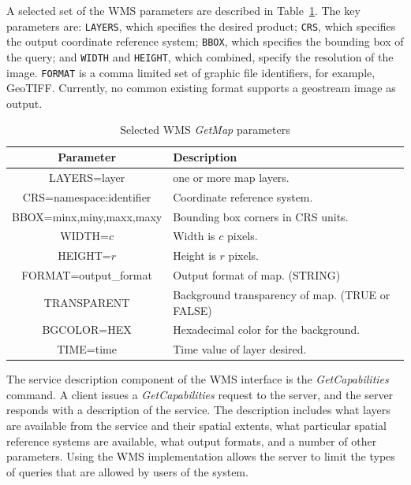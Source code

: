 \documentclass{ucdthesis}       %
\begin{document}
A selected set of the \ac{WMS} parameters are described in
Table~\ref{tab:wms-getmap-parameters}.  The key parameters are:
\texttt{LAYERS}, which specifies the desired product; \texttt{CRS},
which specifies the output coordinate reference system; \texttt{BBOX},
which specifies the bounding box of the query; and \texttt{WIDTH} and
\texttt{HEIGHT}, which combined, specify the resolution of the image.
\texttt{FORMAT} is a comma limited set of graphic file identifiers,
for example, GeoTIFF.  Currently, no common existing format supports a
geostream image as output.
%
\begin{table}[htb]
  \centering
  \caption{Selected \ac{WMS} \emph{GetMap} parameters}
  \begin{tabular}{c|l}
    Parameter & Description \\
    \hline \hline
    LAYERS=layer & one or more map layers.\\
    CRS=namespace:identifier & Coordinate reference system. \\
    BBOX=minx,miny,maxx,maxy & Bounding box corners in CRS units.\\
    WIDTH=$c$ & Width is $c$ pixels.\\
    HEIGHT=$r$ & Height is $r$ pixels.\\
    FORMAT=output\_format & Output format of map. (STRING)\\
    TRANSPARENT & Background transparency of map. (TRUE or FALSE) \\
    BGCOLOR=HEX & Hexadecimal color for the background. \\
    TIME=time & Time value of layer desired. \\
  \end{tabular}
  \label{tab:wms-getmap-parameters}
\end{table}

The service description component of the \ac{WMS} interface is the
\emph{GetCapabilities} command.  A client issues a
\emph{GetCapabilities} request to the server, and the server responds
with a description of the service.  The description includes what
layers are available from the service and their spatial extents, what
particular spatial reference systems are available, what output
formats, and a number of other parameters.  Using the \ac{WMS}
implementation allows the server to limit the types of queries that
are allowed by users of the system.
\end{document}
